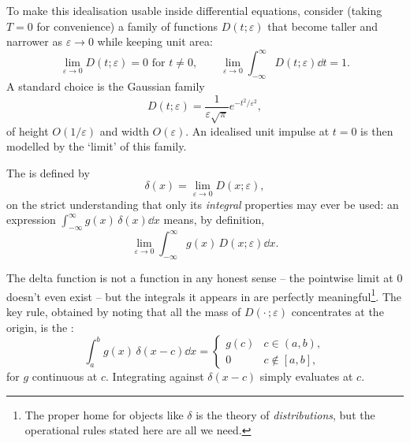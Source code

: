 To make this idealisation usable inside differential equations, consider (taking $T = 0$ for convenience) a family of functions $D(t; \varepsilon)$ that become taller and narrower as $\varepsilon \to 0$ while keeping unit area:
$$
\lim_{\varepsilon \to 0} D(t;\varepsilon) = 0 \text{ for } t \neq 0, \qquad \lim_{\varepsilon \to 0} \int_{-\infty}^{\infty} D(t; \varepsilon) \dd t = 1.
$$
A standard choice is the Gaussian family
$$
D(t; \varepsilon) = \frac{1}{\varepsilon \sqrt \pi} e^{-t^2/\varepsilon^2},
$$
of height $O(1/\varepsilon)$ and width $O(\varepsilon)$. An idealised unit impulse at $t = 0$ is then modelled by the `limit' of this family.

\begin{center}
\end{center}

\begin{definition}
	The  is defined by
	$$
	\delta(x) = \lim_{\varepsilon \to 0} D(x; \varepsilon),
	$$
	on the strict understanding that only its \emph{integral} properties may ever be used: an expression $\int_{-\infty}^{\infty} g(x)\, \delta(x) \dd x$ means, by definition,
	$$
	\lim_{\varepsilon \to 0} \int_{-\infty}^\infty g(x) \, D(x; \varepsilon) \dd x.
	$$
\end{definition}

The delta function is not a function in any honest sense -- the pointwise limit at $0$ doesn't even exist -- but the integrals it appears in are perfectly meaningful\footnote{The proper home for objects like $\delta$ is the theory of \emph{distributions}, but the operational rules stated here are all we need.}. The key rule, obtained by noting that all the mass of $D(\cdot\,; \varepsilon)$ concentrates at the origin, is the :
$$
\int_a^b g(x) \, \delta(x - c) \dd x = \begin{cases} g(c) & c \in (a, b), \\ 0 & c \notin [a, b], \end{cases}
$$
for $g$ continuous at $c$. Integrating against $\delta(x - c)$ simply evaluates at $c$.

